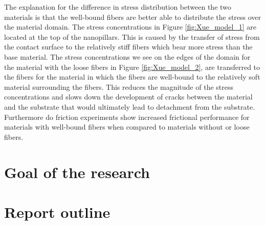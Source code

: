 \qquad The explanation for the difference in stress distribution between the two materials is that the well-bound fibers are better able to distribute the stress over the material domain. The stress concentrations in Figure \ref{fig:Xue_model_1} are located at the top of the nanopillars. This is caused by the transfer of stress from the contact surface to the relatively stiff fibers which bear more stress than the base material. The stress concentrations we see on the edges of the domain for the material with the loose fibers in Figure \ref{fig:Xue_model_2}, are transferred to the fibers for the material in which the fibers are well-bound to the relatively soft material surrounding the fibers. This reduces the magnitude of the stress concentrations and slows down the development of cracks between the material and the substrate that would ultimately lead to detachment from the substrate. Furthermore do friction experiments show increased frictional performance for materials with well-bound fibers when compared to materials without or loose fibers.






\section{Goal of the research}\label{sec:goal}
\section{Report outline}\label{sec:outline}